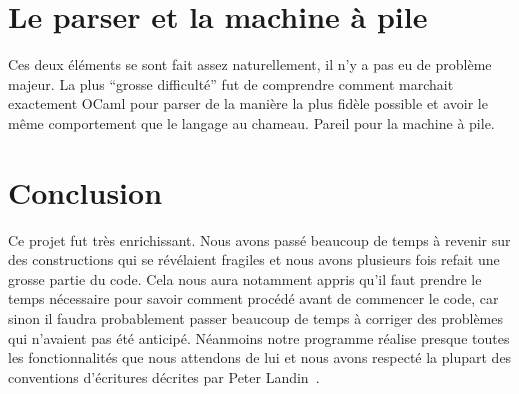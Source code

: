 \documentclass[10pt,a4paper]{article}
\begin{document}
\section{Le parser et la machine à pile}
Ces deux éléments se sont fait assez naturellement, il n'y a pas eu de problème majeur. La plus ``grosse difficulté'' fut de comprendre comment marchait exactement OCaml pour parser de la manière la plus fidèle possible et avoir le même comportement que le langage au chameau. Pareil pour la machine à pile.

\section{Conclusion}
Ce projet fut très enrichissant. Nous avons passé beaucoup de temps à revenir sur des constructions qui se révélaient fragiles et nous avons plusieurs fois refait une grosse partie du code. Cela nous aura notamment appris qu'il faut prendre le temps nécessaire pour savoir comment procédé avant de commencer le code, car sinon il faudra probablement passer beaucoup de temps à corriger des problèmes qui n'avaient pas été anticipé. Néanmoins notre programme réalise presque toutes les fonctionnalités que nous attendons de lui et nous avons respecté la plupart des conventions d'écritures décrites par Peter Landin~\cite{landin66}.



\end{document}
